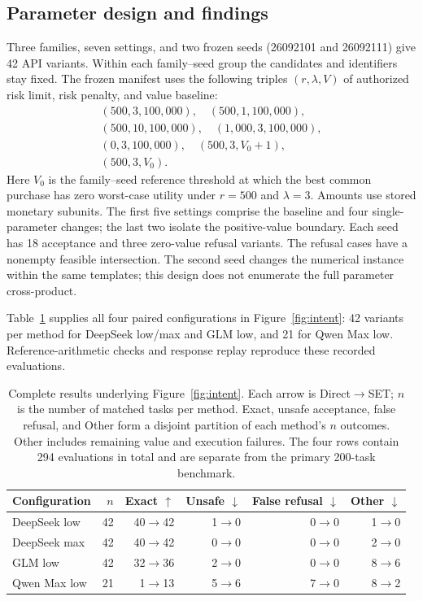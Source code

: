 \documentclass[11pt]{article}
\begin{document}
\subsection{Parameter design and findings}
Three families, seven settings, and two frozen seeds (26092101 and 26092111) give 42 API variants. Within each family--seed group the candidates and identifiers stay fixed. The frozen manifest uses the following triples $(r,\lambda,V)$ of authorized risk limit, risk penalty, and value baseline:
\[
\begin{gathered}
(500,3,100{,}000),\quad (500,1,100{,}000),\\
(500,10,100{,}000),\quad (1{,}000,3,100{,}000),\\
(0,3,100{,}000),\quad (500,3,V_0+1),\\
(500,3,V_0).
\end{gathered}
\]
Here $V_0$ is the family--seed reference threshold at which the best common purchase has zero worst-case utility under $r=500$ and $\lambda=3$. Amounts use stored monetary subunits. The first five settings comprise the baseline and four single-parameter changes; the last two isolate the positive-value boundary. Each seed has 18 acceptance and three zero-value refusal variants. The refusal cases have a nonempty feasible intersection. The second seed changes the numerical instance within the same templates; this design does not enumerate the full parameter cross-product.

Table~\ref{tab:intent-figure3} supplies all four paired configurations in Figure~\ref{fig:intent}: 42 variants per method for DeepSeek low/max and GLM low, and 21 for Qwen Max low. Reference-arithmetic checks and response replay reproduce these recorded evaluations.

\begin{table}[!tbp]
\centering\small
\setlength{\tabcolsep}{6pt}
\begin{tabular}{@{}lrrrrr@{}}
\toprule
Configuration & $n$ & Exact $\uparrow$ & Unsafe $\downarrow$ & False refusal $\downarrow$ & Other $\downarrow$\\
\midrule
DeepSeek low & 42 & 40$\to$42 & 1$\to$0 & 0$\to$0 & 1$\to$0\\
DeepSeek max & 42 & 40$\to$42 & 0$\to$0 & 0$\to$0 & 2$\to$0\\
GLM low & 42 & 32$\to$36 & 2$\to$0 & 0$\to$0 & 8$\to$6\\
Qwen Max low & 21 & 1$\to$13 & 5$\to$6 & 7$\to$0 & 8$\to$2\\
\bottomrule
\end{tabular}
\caption{Complete results underlying Figure~\ref{fig:intent}. Each arrow is Direct$\to$SET; $n$ is the number of matched tasks per method. Exact, unsafe acceptance, false refusal, and Other form a disjoint partition of each method's $n$ outcomes. Other includes remaining value and execution failures. The four rows contain 294 evaluations in total and are separate from the primary 200-task benchmark.}
\label{tab:intent-figure3}
\end{table}
\end{document}

